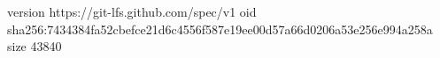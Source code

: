 version https://git-lfs.github.com/spec/v1
oid sha256:7434384fa52cbefce21d6c4556f587e19ee00d57a66d0206a53e256e994a258a
size 43840
